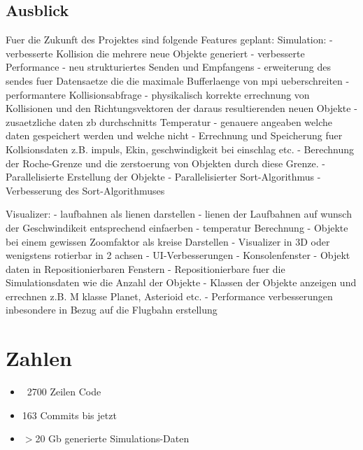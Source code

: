 \subsection{Ausblick}
Fuer die Zukunft des Projektes sind folgende Features geplant:
    Simulation:
        - verbesserte Kollision die mehrere neue Objekte generiert
        - verbesserte Performance
        - neu strukturiertes Senden und Empfangens
        - erweiterung des sendes fuer Datensaetze die die maximale
          Bufferlaenge von mpi ueberschreiten
        - performantere Kollisionsabfrage
        - physikalisch korrekte errechnung von Kollisionen und den
          Richtungsvektoren der daraus resultierenden neuen Objekte
        - zusaetzliche daten zb durchschnitts Temperatur
        - genauere angeaben welche daten gespeichert werden und welche nicht
        - Errechnung und Speicherung fuer Kollsionsdaten z.B. impuls, Ekin,
          geschwindigkeit bei einschlag etc.
        - Berechnung der Roche-Grenze und die zerstoerung von Objekten 
          durch diese Grenze.
        - Parallelisierte Erstellung der Objekte
        - Parallelisierter Sort-Algorithmus
        - Verbesserung des Sort-Algorithmuses

    Visualizer:
        - laufbahnen als lienen darstellen
        - lienen der Laufbahnen auf wunsch der Geschwindikeit entsprechend
          einfaerben
        - temperatur Berechnung
        - Objekte bei einem gewissen Zoomfaktor als kreise Darstellen
        - Visualizer in 3D oder wenigstens rotierbar in 2 achsen
        - UI-Verbesserungen
        - Konsolenfenster
        - Objekt daten in Repositionierbaren Fenstern
        - Repositionierbare fuer die Simulationsdaten wie die Anzahl der Objekte
        - Klassen der Objekte anzeigen und errechnen z.B. M klasse Planet, Asterioid etc.
        - Performance verbesserungen inbesondere in Bezug auf die Flugbahn erstellung
 
\section{Zahlen}
\begin{itemize}
    \item ~2700 Zeilen Code
    \item 163 Commits bis jetzt
    \item $>$20 Gb generierte Simulations-Daten
\end{itemize}

